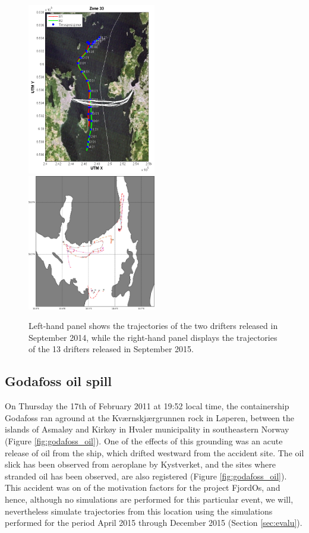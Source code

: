 \begin{figure}[ht]
	\centerline{
		\includegraphics*[width=0.5\textwidth]{Figurer/drifters_sept2014}
		\includegraphics*[width=0.5\textwidth]{Figurer/drifters_low_crop}
		}
	\caption{\small Left-hand panel shows the trajectories of the two drifters released in September 2014, while the right-hand panel displays the trajectories of the 13 drifters released in September 2015.}
	\label{fig:drifters_tracks}
\end{figure}

\subsection{Godafoss oil spill}
\label{sect:godafoss_obs}
On Thursday the 17th of February 2011 at 19:52 local time, the containership Godafoss ran aground at the Kv{\ae}rnskj{\ae}rgrunnen rock in L{\o}peren, between the islands of Asmal{\o}y and Kirk{\o}y in Hvaler municipality in southeastern Norway (Figure \ref{fig:godafoss_oil}). One of the effects of this grounding was an acute release of oil from the ship, which drifted westward from the accident site. The oil slick has been observed from aeroplane by Kystverket, and the sites where stranded oil has been observed, are also registered (Figure \ref{fig:godafoss_oil}). This accident was on of the motivation factors for the project FjordOs, and hence, although no simulations are performed for this particular event, we will, nevertheless simulate trajectories from this location using the simulations performed for the period April 2015 through December 2015 (Section \ref{sec:evalu}). 

